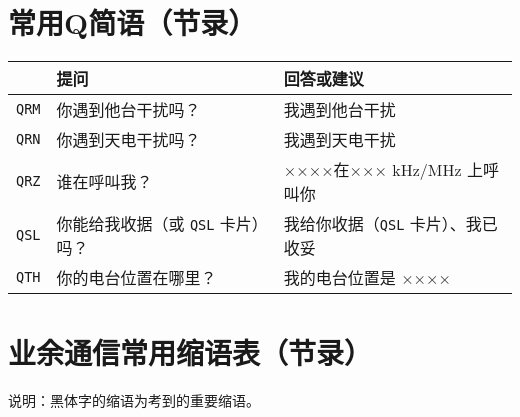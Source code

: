 \newpage

\section{常用Q简语（节录）}

\begin{longtable}{|l|l|l|}
	\hline
	    & \textbf{提问} & \textbf{回答或建议} \\
	\hline
	\texttt{QRM} & 你遇到他台干扰吗？ & 我遇到他台干扰 \\
	\hline
	\texttt{QRN} & 你遇到天电干扰吗？ & 我遇到天电干扰 \\
	\hline
	\texttt{QRZ} & 谁在呼叫我？ &  ××××在××× \si{\kHz}/\si{\MHz} 上呼叫你\cite{Q_code} \\
	\hline
	\texttt{QSL} & 你能给我收据（或 \texttt{QSL} 卡片）吗？ & 我给你收据（\texttt{QSL} 卡片）、我已收妥 \\
	\hline
	\texttt{QTH} & 你的电台位置在哪里？ & 我的电台位置是 ×××× \\
	\hline
\end{longtable}

\newpage



\section{业余通信常用缩语表（节录）}

说明：黑体字的缩语为考到的重要缩语。

